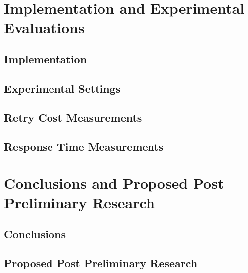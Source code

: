 \documentclass[12pt,english]{report}
\begin{document}


\chapter{\label{ch_exp} Implementation and Experimental Evaluations}

\section{Implementation}
\section{Experimental Settings}
\section{Retry Cost Measurements}
\section{Response Time Measurements}

\chapter{\label{conclusions} Conclusions and Proposed Post Preliminary Research}

\section{Conclusions}

\section{Proposed Post Preliminary Research}



\end{document}
